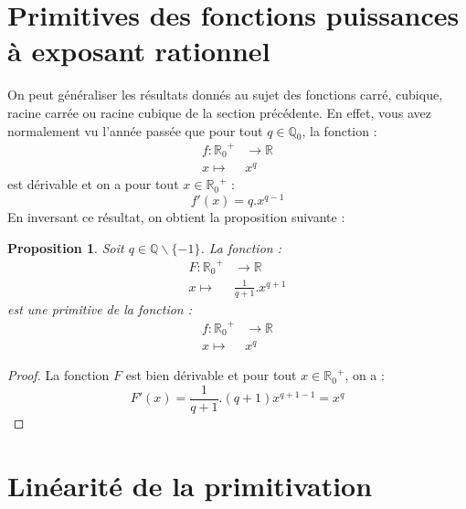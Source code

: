 \documentclass[a4paper,fontsize=13pt]{scrreprt}
\theoremstyle{plain}
\newtheorem{pro}[subsection]{Proposition}
\theoremstyle{definition}
\newcommand{\qu}{\mathbb{Q}}
\newcommand{\rr}{\mathbb{R}}
\begin{document}
\section{Primitives des fonctions puissances à exposant rationnel}
On peut généraliser les résultats donnés au sujet des fonctions carré, cubique, racine carrée ou racine cubique de la section précédente. En effet, vous avez normalement vu l'année passée que pour tout $q \in {\qu}_{0}$, la fonction :
\begin{align*}
f : {{\rr}_{0}}^{+} &\to \rr \\
x \mapsto& x^q
\end{align*}
est dérivable et on a pour tout $x \in {{\rr}_{0}}^{+}$ :
$$f'(x) = q.x^{q-1}$$
En \og inversant \fg{} ce résultat, on obtient la proposition suivante :
\begin{pro}
Soit $q \in {\qu} \backslash \{-1\}$. La fonction :
\begin{align*}
F : {{\rr}_{0}}^{+} &\to \rr \\
x \mapsto& \frac{1}{q+1}.x^{q+1}
\end{align*}
est une primitive de la fonction :
\begin{align*}
f : {{\rr}_{0}}^{+} &\to \rr \\
x \mapsto& x^q
\end{align*}
\end{pro}
\begin{proof}
La fonction $F$ est bien dérivable et pour tout $x\in {{\rr}_{0}}^{+}$, on a :
$$F'(x) = \frac{1}{q+1}.(q+1)x^{q+1-1} = x^q$$ 
\end{proof}

\section{Linéarité de la primitivation}
\end{document}
